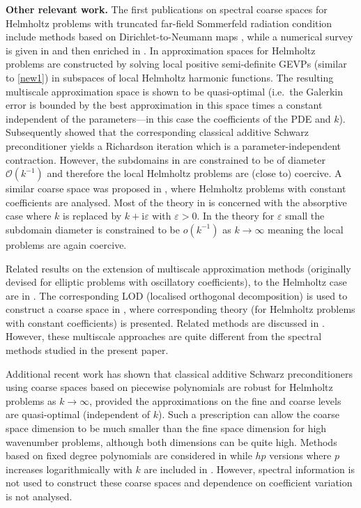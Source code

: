\documentclass[numbers,webpdf,imaiai]{ima-authoring-template}%
\theoremstyle{thmstyletwo}%
\numberwithin{equation}{section}
\numberwithin{equation}{section}
\begin{document}
{\vspace{0.1cm}
\noindent
\textbf{Other relevant work.}
The first publications on spectral coarse spaces for Helmholtz problems with truncated far-field Sommerfeld radiation condition   
include methods based on Dirichlet-to-Neumann maps \cite{Conen:2014:ACS,Bootland:2019:ODN},
while a  numerical survey is given in  \cite{Bootland:2021:ACS} and then enriched in \cite{Dolean:2026:AWR}. 
In \cite{MaAlSc:23} approximation spaces for Helmholtz problems are constructed by solving local positive semi-definite GEVPs  
(similar to \eqref{new1}) in subspaces of local Helmholtz harmonic functions.  
The resulting multiscale approximation space is shown to be  quasi-optimal 
(i.e.\ the Galerkin error is bounded by the best approximation in this space times a constant independent of the parameters---in this case 
the coefficients of the PDE and $k$).  
Subsequently \cite{MaAlSc:24} showed that the corresponding classical additive Schwarz preconditioner yields a Richardson iteration 
which is a parameter-independent contraction.  However, the subdomains in \cite{MaAlSc:24} are constrained to be
of diameter $\mathcal{O}(k^{-1})$ and therefore the local Helmholtz problems are (close to) coercive.
A similar coarse space was proposed in \cite{Hu:2024:ANC}, where Helmholtz problems with constant coefficients are analysed. 
Most of the theory in \cite{Hu:2024:ANC} is concerned with the absorptive case where $k$ is replaced by $k + \mathrm{i} \varepsilon$
with $\varepsilon>0$. In the theory for  $\varepsilon$  small the subdomain diameter is constrained to be $o(k^{-1})$
as $k \rightarrow \infty$ meaning the local problems are again coercive. 

Related results on the extension of multiscale approximation methods (originally devised
for elliptic problems with oscillatory coefficients), to the Helmholtz case are in \cite{Pe:17}.
The corresponding LOD (localised orthogonal decomposition) is used to construct a coarse space in \cite{LuXuZhZo:24}, 
where corresponding theory (for Helmholtz problems with constant coefficients) is presented. 
Related methods are discussed in \cite{FuGoLiWa:24}. 
However, these multiscale approaches are quite different from the spectral methods studied in the present paper. 

Additional recent work \cite{graham:2025:TLH} has shown that classical additive Schwarz preconditioners using coarse spaces 
based on piecewise polynomials are robust for Helmholtz problems as $k \rightarrow \infty$, 
provided the approximations on the fine and coarse levels are  quasi-optimal (independent of $k$). 
Such a prescription can allow the coarse space dimension to be much smaller than the fine space dimension for high wavenumber problems, 
although both dimensions can be quite high. Methods based on fixed degree polynomials are considered in \cite{Galkowski:2025:CTT} 
while $hp$ versions where $p$ increases logarithmically with $k$ are included in \cite{graham:2025:TLH}. 
However, spectral information is not used to construct these coarse spaces and dependence on coefficient variation is not analysed.


}
\end{document}
